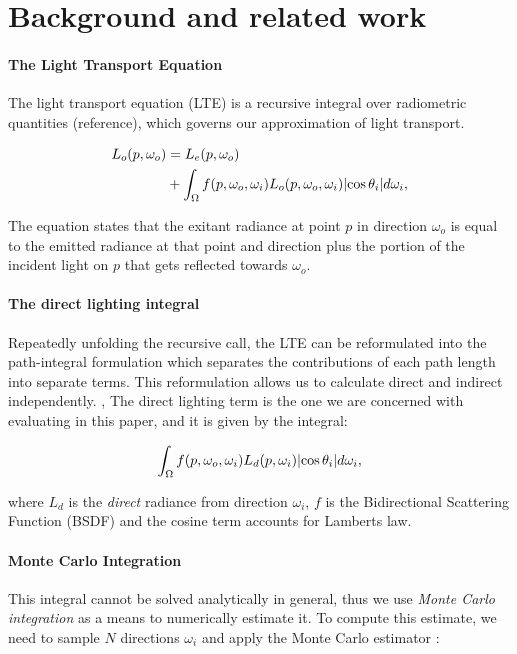 \section{Background and related work}
\label{sec:background}

\paragraph*{The Light Transport Equation} 
The light transport equation (LTE) \cite{kajiyaRENDERINGEQUATION1986} is a recursive integral over radiometric quantities (reference), which governs our approximation of light transport.

\begin{equation}
  \begin{aligned}
  L_o(p, \omega_o) &= L_e(p, \omega_o)\\
  &+ \int_{\Omega} f(p, \omega_o, \omega_i) L_o(p, \omega_o, \omega_i) \lvert\cos\theta_i\rvert d\omega_i,
  \end{aligned}
\end{equation}

The equation states that the exitant radiance at point $p$ in direction $\omega_o$ is equal to the emitted radiance at that point and direction plus the portion of the incident light on $p$ that gets reflected towards $\omega_o$.

\paragraph{The direct lighting integral} 

Repeatedly unfolding the recursive call, the LTE can be reformulated into the path-integral formulation \cite*{veachROBUSTMONTECARLO} which separates the contributions of each path length into separate terms. This reformulation allows us to calculate direct and indirect independently. , The direct lighting term is the one we are concerned with evaluating in this paper, and it is given by the integral:

\begin{equation}
  \int_{\Omega} f(p, \omega_o, \omega_i) L_d(p, \omega_i) \lvert\cos\theta_i\rvert d\omega_i,
\end{equation}

where $L_d$ is the \emph{direct} radiance from direction $\omega_i$, $f$ is the Bidirectional Scattering Function (BSDF) and the cosine term accounts for Lamberts law.

\paragraph*{Monte Carlo Integration}
This integral cannot be solved analytically in general, thus we use \emph{Monte Carlo integration} as a means to numerically estimate it. To compute this estimate, we need to sample $N$ directions $\omega_i$ and apply the Monte Carlo estimator \cite{L1996MCTAOFPBR}:

